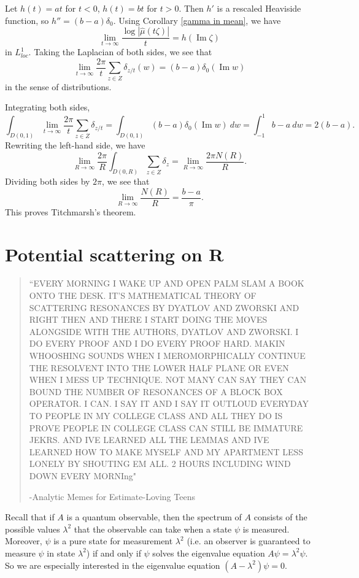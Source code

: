 \documentclass[12pt]{report}
\newcommand{\RR}{\mathbf{R}}
\renewcommand{\Im}{\operatorname{Im}}
\theoremstyle{definition}
\theoremstyle{remark}
\begin{document}
Let $h(t) = at$ for $t < 0$, $h(t) = bt$ for $t > 0$. Then $h'$ is a rescaled Heaviside function, so $h'' = (b-a)\delta_0$. Using Corollary \ref{gamma in mean}, we have
$$\lim_{t \to \infty} \frac{\log |\hat \mu(t\zeta)|}{t} = h(\Im \zeta)$$
in $L^1_{loc}$. Taking the Laplacian of both sides, we see that
$$\lim_{t \to \infty} \frac{2\pi}{t} \sum_{z \in Z} \delta_{z/t}(w) = (b-a)\delta_0(\Im w)$$
in the sense of distributions.

Integrating both sides,
$$\int_{D(0, 1)} \lim_{t \to \infty} \frac{2\pi}{t} \sum_{z \in Z} \delta_{z/t} = \int_{D(0, 1)} (b-a)\delta_0(\Im w) ~dw = \int_{-1}^1 b - a ~dw = 2(b - a).$$
Rewriting the left-hand side, we have
$$\lim_{R \to \infty} \frac{2\pi }{R} \int_{D(0, R)} \sum_{z \in Z} \delta_z = \lim_{R \to \infty} \frac{2\pi N(R)}{R}.$$
Dividing both sides by $2\pi$, we see that
$$\lim_{R \to \infty} \frac{N(R)}{R} = \frac{b - a}{\pi}.$$
This proves Titchmarsh's theorem.


\chapter{Potential scattering on $\RR$}
\begin{quote}
  ``EVERY MORNING I WAKE UP AND OPEN PALM SLAM A BOOK ONTO THE DESK. IT'S MATHEMATICAL THEORY OF SCATTERING RESONANCES BY DYATLOV AND ZWORSKI AND RIGHT THEN AND THERE I START DOING THE MOVES ALONGSIDE WITH THE AUTHORS, DYATLOV AND ZWORSKI. I DO EVERY PROOF AND I DO EVERY PROOF HARD. MAKIN WHOOSHING SOUNDS WHEN I MEROMORPHICALLY CONTINUE THE RESOLVENT INTO THE LOWER HALF PLANE OR EVEN WHEN I MESS UP TECHNIQUE. NOT MANY CAN SAY THEY CAN BOUND THE NUMBER OF RESONANCES OF A BLOCK BOX OPERATOR. I CAN. I SAY IT AND I SAY IT OUTLOUD EVERYDAY TO PEOPLE IN MY COLLEGE CLASS AND ALL THEY DO IS PROVE PEOPLE IN COLLEGE CLASS CAN STILL BE IMMATURE JEKRS. AND IVE LEARNED ALL THE LEMMAS AND IVE LEARNED HOW TO MAKE MYSELF AND MY APARTMENT LESS LONELY BY SHOUTING EM ALL. 2 HOURS INCLUDING WIND DOWN EVERY MORNIng"

  -Analytic Memes for Estimate-Loving Teens
\end{quote}

Recall that if $A$ is a quantum observable, then the spectrum of $A$ consists of the possible values $\lambda^2$ that the observable can take when a state $\psi$ is measured. Moreover, $\psi$ is a pure state for measurement $\lambda^2$ (i.e. an observer is guaranteed to measure $\psi$ in state $\lambda^2$) if and only if $\psi$ solves the eigenvalue equation $A\psi = \lambda^2 \psi$. So we are especially interested in the eigenvalue equation $(A - \lambda^2)\psi = 0$.
\end{document}

